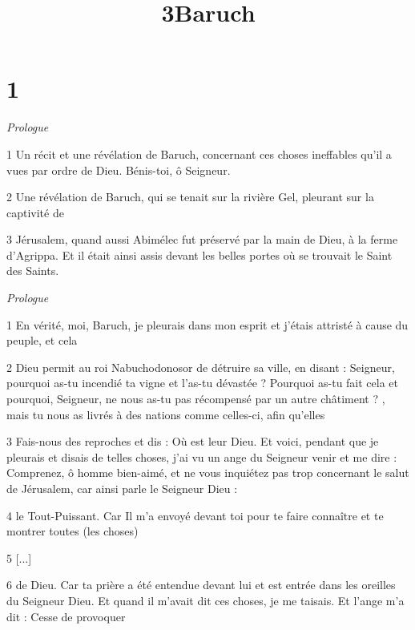 

\title{3Baruch}

\chapter{1}

\par \textit{Prologue}

\par 1 Un récit et une révélation de Baruch, concernant ces choses ineffables qu'il a vues par ordre de Dieu. Bénis-toi, ô Seigneur.

\par 2 Une révélation de Baruch, qui se tenait sur la rivière Gel, pleurant sur la captivité de

\par 3 Jérusalem, quand aussi Abimélec fut préservé par la main de Dieu, à la ferme d'Agrippa. Et il était ainsi assis devant les belles portes où se trouvait le Saint des Saints.


\par \textit{Prologue}

\par 1 En vérité, moi, Baruch, je pleurais dans mon esprit et j'étais attristé à cause du peuple, et cela

\par 2 Dieu permit au roi Nabuchodonosor de détruire sa ville, en disant : Seigneur, pourquoi as-tu incendié ta vigne et l'as-tu dévastée ? Pourquoi as-tu fait cela et pourquoi, Seigneur, ne nous as-tu pas récompensé par un autre châtiment ? , mais tu nous as livrés à des nations comme celles-ci, afin qu'elles

\par 3 Fais-nous des reproches et dis : Où est leur Dieu. Et voici, pendant que je pleurais et disais de telles choses, j'ai vu un ange du Seigneur venir et me dire : Comprenez, ô homme bien-aimé, et ne vous inquiétez pas trop concernant le salut de Jérusalem, car ainsi parle le Seigneur Dieu :

\par 4 le Tout-Puissant. Car Il m'a envoyé devant toi pour te faire connaître et te montrer toutes (les choses)

\par 5 [...]

\par 6 de Dieu. Car ta prière a été entendue devant lui et est entrée dans les oreilles du Seigneur Dieu. Et quand il m'avait dit ces choses, je me taisais. Et l'ange m'a dit : Cesse de provoquer

